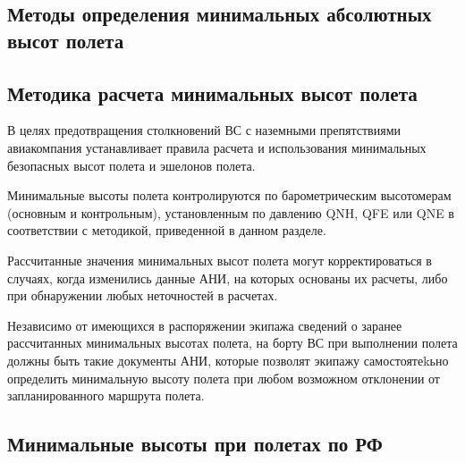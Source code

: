 %

\begin{appendix}



\section{Методы определения минимальных абсолютных высот полета}    
\subsection{Методика расчета минимальных высот полета}


 В целях предотвращения столкновений ВС с наземными препятствиями авиакомпания устанавливает правила расчета и использования минимальных безопасных высот полета и эшелонов полета.

 Минимальные высоты полета контролируются по барометрическим высотомерам (основным и контрольным), установленным по давлению QNH, QFE или QNE в соответствии с методикой, приведенной в данном разделе. 

 Рассчитанные значения минимальных высот полета могут корректироваться в случаях, когда изменились данные АНИ, на которых основаны их расчеты, либо при обнаружении любых неточностей в расчетах.




 Независимо от имеющихся в распоряжении экипажа сведений о заранее рассчитанных минимальных высотах полета, на борту ВС при выполнении полета должны быть такие документы АНИ, которые позволят экипажу самостоятеkьно определить минимальную высоту полета при любом возможном отклонении от запланированного маршрута полета.
 
    \subsection{Минимальные высоты при полетах по РФ}


\end{appendix}
